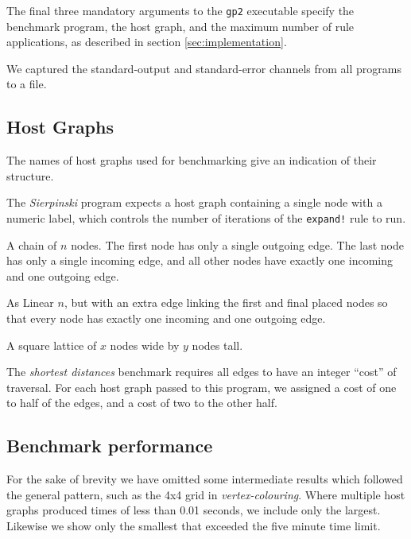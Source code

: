 The final three mandatory arguments to the \texttt{gp2} executable specify the benchmark program, the host graph, and the maximum number of rule applications, as described in section \ref{sec:implementation}.

We captured the standard-output and standard-error channels from all programs to a file.

\subsection{Host Graphs}
\label{subsec:hosts}

The names of host graphs used for benchmarking give an indication of their structure.

\begin{description}
	\setlength\itemsep{-0.2em}
	\item[Gen $n$] The \textit{Sierpinski} program expects a host graph containing a single node with a numeric label, which controls the number of iterations of the \texttt{expand!} rule to run.

	\item[Linear $n$] A chain of $n$ nodes. The first node has only a single outgoing edge. The last node has only a single incoming edge, and all other nodes have exactly one incoming and one outgoing edge.

	\item[Cyclic $n$] As Linear $n$, but with an extra edge linking the first and final placed nodes so that every node has exactly one incoming and one outgoing edge.

	\item[$x \times y$ Grid] A square lattice of $x$ nodes wide by $y$ nodes tall.
\end{description}

The \textit{shortest distances} benchmark requires all edges to have an integer ``cost'' of traversal. For each host graph passed to this program, we assigned a cost of one to half of the edges, and a cost of two to the other half.



\subsection{Benchmark performance}\label{sec:benchperf}

For the sake of brevity we have omitted some intermediate results which followed the general pattern, such as the 4x4 grid in \textit{vertex-colouring}. Where multiple host graphs produced times of less than 0.01 seconds, we include only the largest. Likewise we show only the smallest that exceeded the five minute time limit.



